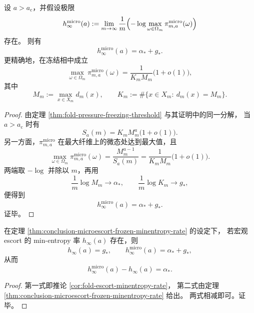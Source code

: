 \begin{theorem}\label{thm:conclusion-microescort-frozen-minentropy-rate}
设 \(a>a_{\mathrm c}\)，并假设极限
\[
h_\infty^{\mathrm{micro}}(a)
:=
\lim_{m\to\infty}\frac1m
\Bigl(
-\log \max_{\omega\in\Omega_m}\pi_{m,a}^{\mathrm{micro}}(\omega)
\Bigr)
\]
存在。
则有
\[
h_\infty^{\mathrm{micro}}(a)=\alpha_\ast+g_\ast.
\]
更精确地，在冻结相中成立
\[
\max_{\omega\in\Omega_m}\pi_{m,a}^{\mathrm{micro}}(\omega)
=
\frac{1}{K_mM_m}\bigl(1+o(1)\bigr),
\]
其中
\[
M_m:=\max_{x\in X_m}d_m(x),
\qquad
K_m:=\#\{x\in X_m:\ d_m(x)=M_m\}.
\]
\end{theorem}
\begin{proof}
由定理 \ref{thm:fold-pressure-freezing-threshold} 与其证明中的同一分解，
当 \(a>a_{\mathrm c}\) 时有
\[
S_a(m)=K_mM_m^a\bigl(1+o(1)\bigr).
\]
另一方面，\(\pi_{m,a}^{\mathrm{micro}}\) 在最大纤维上的微态处达到最大值，且
\[
\max_{\omega\in\Omega_m}\pi_{m,a}^{\mathrm{micro}}(\omega)
=
\frac{M_m^{a-1}}{S_a(m)}
=
\frac{1}{K_mM_m}\bigl(1+o(1)\bigr).
\]
两端取 \(-\log\) 并除以 \(m\)，再用
\[
\frac1m\log M_m\to \alpha_\ast,
\qquad
\frac1m\log K_m\to g_\ast,
\]
便得到
\[
h_\infty^{\mathrm{micro}}(a)=\alpha_\ast+g_\ast.
\]
证毕。
\end{proof}

\begin{corollary}\label{cor:conclusion-micro-vs-macro-freezing-minentropy-gap}
在定理 \ref{thm:conclusion-microescort-frozen-minentropy-rate} 的设定下，
若宏观 escort 的 min-entropy 率 \(h_\infty(a)\) 存在，则
\[
h_\infty(a)=g_\ast,
\qquad
h_\infty^{\mathrm{micro}}(a)=\alpha_\ast+g_\ast,
\]
从而
\[
h_\infty^{\mathrm{micro}}(a)-h_\infty(a)=\alpha_\ast.
\]
\end{corollary}
\begin{proof}
第一式即推论 \ref{cor:fold-escort-minentropy-rate}，
第二式由定理 \ref{thm:conclusion-microescort-frozen-minentropy-rate} 给出。
两式相减即可。证毕。
\end{proof}

